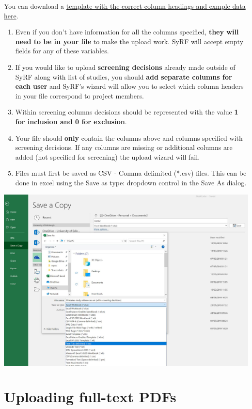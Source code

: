 \documentclass[
]{book}
\providecommand{\tightlist}{%
  \setlength{\itemsep}{0pt}\setlength{\parskip}{0pt}}
\begin{document}
You can download a \href{https://syrf.org.uk/assets/pdfs/Systematic_search_instructions.html}{template with the correct column headings and exmple data here}.

\begin{enumerate}
\def\labelenumi{\arabic{enumi}.}
\setcounter{enumi}{2}
\tightlist
\item
  Even if you don't have information for all the columns specified, \textbf{they will need to be in your file} to make the upload work. SyRF will accept empty fields for any of these variables.
\item
  If you would like to upload \textbf{screening decisions} already made outside of SyRF along with list of studies, you should \textbf{add separate columns for each user} and SyRF's wizard will allow you to select which column headers in your file correspond to project members.
\item
  Within screening columns decisions should be represented with the value \textbf{1 for inclusion and 0 for exclusion}.
\item
  Your file should \textbf{only} contain the columns above and columns specified with screening decisions. If any columns are missing or additional columns are added (not specified for screening) the upload wizard will fail.
\item
  Files must first be saved as CSV - Comma delimited (*.csv) files. This can be done in excel using the Save as type: dropdown control in the Save As dialog.
\end{enumerate}

\includegraphics[width=32.71in]{figs/save_csv}

\hypertarget{uploading-full-text-pdfs}{%
\section{Uploading full-text PDFs}\label{uploading-full-text-pdfs}}
\end{document}
